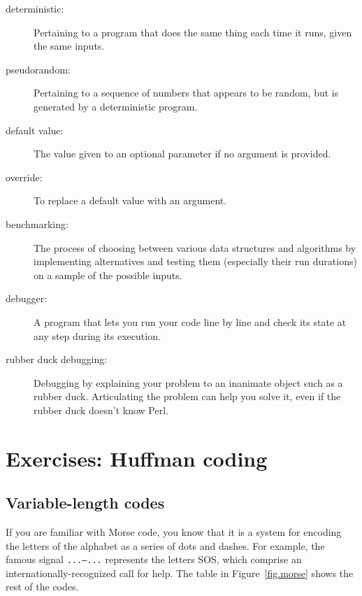 \begin{description}

\item[deterministic:] Pertaining to a program that does the same
thing each time it runs, given the same inputs.

\item[pseudorandom:] Pertaining to a sequence of numbers that appears
to be random, but is generated by a deterministic program.

\item[default value:] The value given to an optional parameter if no
argument is provided.

\item[override:] To replace a default value with an argument.

\item[benchmarking:] The process of choosing between various data 
structures and algorithms by implementing alternatives and testing 
them (especially their run durations) on a sample of the possible inputs.  

\item[debugger:] A program that lets you run your code line by 
line and check its state at any step during its execution.

\item[rubber duck debugging:] Debugging by explaining your problem
to an inanimate object such as a rubber duck.  Articulating the
problem can help you solve it, even if the rubber duck 
doesn't know Perl. 

\end{description}



\section{Exercises: Huffman coding}
\label{huffman_exercise}

\subsection{Variable-length codes}

If you are familiar with Morse code, you know that it is a 
system for encoding the letters of the alphabet as a series 
of dots and dashes. For example, the famous signal {\tt ...---...} 
represents the letters SOS, which comprise an 
internationally-recognized call for help. The table 
in Figure~\ref{fig.morse} shows the rest of the codes.

